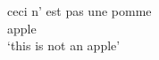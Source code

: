 \ABL
\ABS
\ACC
\ADJ
\ADV
\AGR
\ALL
\ANTIP 
\APPL  
\ART
\AUX
\BEN
\CAUS
\CLF
\COM
\COMP
\COMPL 
\COND
\COP
\CVB
\DAT
\DECL
\DEM
\DEF
\DET
\DIST
\DISTR 
\DU
\DUR
\ERG
\EXCL
\F
\FOC
\FUT
\GEN
\IMP
\INCL
\IND
\INDF
\INS
\INTR
\IPFV
\IRR
\LOC
\N
\NEG
\NMLZ
\NOM
\OBJ
\OBL
\PASS
\PFV
\PL
\POSS
\PRED
\PRF
\PRS
\PROG
\PROH
\PROX
\PST
\PTCP
\PURP
\Q 
\QUOT
\RECP
\REFL
\REL
\RES
\SBJ
\SBJV
\SG
\TOP
\TR
\VOC                    

\ea
\gll ceci n' est pas une pomme\\
     \DET{} \NEG{} \COP{} \NEG{} \INDF{} apple\\
\glt `this is not an apple'     
\z